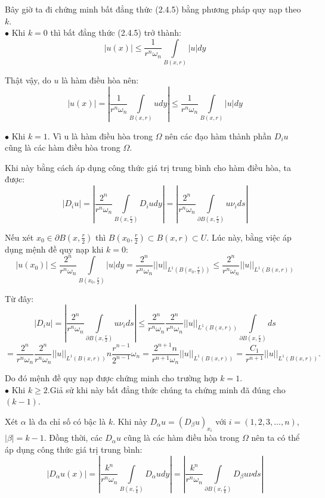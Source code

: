 Bây giờ ta đi chứng minh bất đẳng thức (2.4.5) bằng phương pháp quy nạp theo $k$.\\
$\bullet$ Khi $k=0$ thì bất đẳng thức (2.4.5) trở thành:
\[
|u(x)| \le \frac{1}{{r^n \omega _n }}\int\limits_{B(x,r)} {|u|dy} 
\]

Thật vậy, do $u$ là hàm điều hòa nên:
\[
|u(x)| = |\frac{1}{{r^n \omega _n }}\int\limits_{B(x,r)} {udy} | \le \frac{1}{{r^n \omega _n }}\int\limits_{B(x,r)} {|u|dy} 
\]

$\bullet$ Khi $k=1$. Vì u là hàm điều hòa trong $\Omega$ nên các đạo hàm thành phần $D_i u$ cũng là các hàm điều hòa trong $\Omega$.

Khi này bằng cách áp dụng công thức giá trị trung bình cho hàm điều hòa, ta được:
\[
|D_i u| = |\frac{{2^n }}{{r^n \omega _n }}\int\limits_{B(x,\frac{r}{2})} {D_i udy} | = |\frac{{2^n }}{{r^n \omega _n }}\int\limits_{\partial B(x,\frac{r}{2})} {u\nu _i ds} |
\]

Nếu xét $x_0  \in \partial B(x,\frac{r}{2})$ thì $
B(x_0 ,\frac{r}{2}) \subset B(x,r) \subset U
$. Lúc này, bằng việc áp dụng mệnh đề quy nạp khi $k=0$:
\[
|u(x_0 )| \le \frac{{2^n }}{{r^n \omega _n }}\int\limits_{B(x_0 ,\frac{r}{2})} {|u|dy}  = \frac{{2^n }}{{r^n \omega _n }}||u||_{L^1 (B(x_0 ,\frac{r}{2}))}  \le \frac{{2^n }}{{r^n \omega _n }}||u||_{L^1 (B(x,r))} 
\]

Từ đây:
\[
|D_i u| = |\frac{{2^n }}{{r^n \omega _n }}\int\limits_{\partial B(x,\frac{r}{2})} {u\nu _i ds} | \le \frac{{2^n }}{{r^n \omega _n }}\frac{{2^n }}{{r^n \omega _n }}||u||_{L^1 (B(x,r))} \int\limits_{\partial B(x,\frac{r}{2})} ds \]
\[= \frac{{2^n }}{{r^n \omega _n }}\frac{{2^n }}{{r^n \omega _n }}||u||_{L^1 (B(x,r))} n\frac{{r^{n - 1} }}{{2^{n - 1} }} \omega _n  = \frac{{2^{n + 1} n}}{{r^{n + 1} \omega _n }}||u||_{L^1 (B(x,r))}  = \frac{{C_1 }}{{r^{n + 1} }}||u||_{L^1 (B(x,r))} .
\]

Do đó mệnh đề quy nạp được chứng minh cho trường hợp $k=1$.\\
$\bullet$ Khi $k \geq 2$.Giả sử khi này bất đẳng thức chúng ta chứng minh đã đúng cho $(k-1)$.

Xét $\alpha$ là đa chỉ số có bậc là $k$. Khi này $
D_\alpha  u = (D_\beta  u)_{x_i } $ với $i=(1,2,3,...,n)$,$|\beta|=k-1$. Đồng thời, các $D_\alpha u$ cũng là các hàm điều hòa trong $\Omega$ nên ta có thể áp dụng công thức giá trị trung bình:
\[
|D_\alpha  u(x)| = |\frac{{k^n }}{{r^n \omega _n }}\int\limits_{B(x,\frac{r}{k})} {D_\alpha  udy} | = |\frac{{k^n }}{{r^n \omega _n }}\int\limits_{\partial B(x,\frac{r}{k})} {D_\beta  u\nu ds} |
\]

